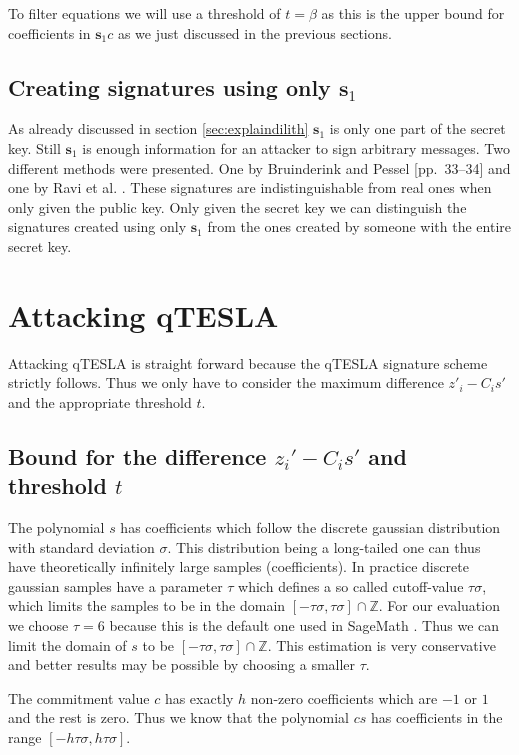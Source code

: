 \documentclass[a4paper,titlepage]{article}
\begin{document}
To filter equations we will use a threshold of $t = \beta$ as this is the upper bound for coefficients in $\bm{s}_{1}c$ as we just discussed in the previous sections.

\subsection{Creating signatures using only $\bm{s}_{1}$}
As already discussed in section \ref{sec:explaindilith} $\bm{s}_{1}$ is only one part of the secret key. Still $\bm{s}_{1}$ is enough information for an attacker to sign arbitrary messages. Two different methods were presented. One by Bruinderink and Pessel \cite{Groot_Bruinderink_Pessl_2018}[pp.~33--34] and one by Ravi et al. \cite[pp.~12--13]{ravi_2018}. These signatures are indistinguishable from real ones when only given the public key. Only given the secret key we can distinguish the signatures created using only $\bm{s}_{1}$ from the ones created by someone with the entire secret key. 


\section{Attacking qTESLA}
Attacking qTESLA is straight forward because the qTESLA signature scheme strictly follows. Thus we only have to consider the maximum difference $z'_{i} - C_{i}s'$ and the appropriate threshold $t$.

\subsection{Bound for the difference $z_{i}' - C_{i}s'$ and threshold $t$}
\label{sec:qteslathreshold}
The polynomial $s$ has coefficients which follow the discrete gaussian distribution with standard deviation $\sigma$. This distribution being a long-tailed one can thus have theoretically infinitely large samples (coefficients). In practice discrete gaussian samples have a parameter $\tau$ which defines a so called cutoff-value $\tau \sigma$, which limits the samples to be in the domain $[-\tau \sigma, \tau \sigma] \cap \mathds{Z}$. For our evaluation we choose $\tau = 6$ because this is the default one used in SageMath \cite{sagetau}. Thus we can limit the domain of $s$ to be $[-\tau \sigma, \tau \sigma] \cap \mathds{Z}$. This estimation is very conservative and better results may be possible by choosing a smaller $\tau$.

The commitment value $c$ has exactly $h$ non-zero coefficients which are $-1$ or $1$ and the rest is zero. Thus we know that the polynomial $cs$ has coefficients in the range $[-h \tau \sigma, h \tau \sigma]$.
\end{document}
